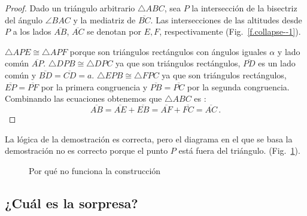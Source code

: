 \begin{proof}
Dado un triángulo arbitrario $\triangle ABC$, sea $P$ la intersección de la bisectriz del ángulo $\angle BAC$ y la mediatriz de $\overline{BC}$. Las intersecciones de las altitudes desde $P$ a los lados $\overline{AB}$, $\overline{AC}$ se denotan por $E,F$, respectivamente (Fig.~\ref{f.collapse--1}). 

$\triangle APE\cong \triangle APF$ porque son triángulos rectángulos con ángulos iguales $\alpha$ y lado común $\overline{AP}$. $\triangle DPB\cong \triangle DPC$ ya que son triángulos rectángulos, $\overline{PD}$ es un lado común y $\overline{BD}=\overline{CD}=a$. $\triangle EPB\cong \triangle FPC$ ya que son triángulos rectángulos, $\overline{EP}=\overline{PF}$ por la primera congruencia y $\overline{PB}=\overline{PC}$ por la segunda congruencia. Combinando las ecuaciones obtenemos que $\triangle ABC$ es :
\[
\overline{AB}= \overline{AE}+\overline{EB}=\overline{AF}+\overline{FC} =\overline{AC}\,.
\]
\end{proof}
\vspace{-2.5ex}
La lógica de la demostración es correcta, pero el diagrama en el que se basa la demostración no es correcto porque el punto $P$ está fuera del triángulo. (Fig.~\ref{f.collapse--2}).

\begin{figure}[b]
\begin{center}
\caption{Por qué no funciona la construcción}\label{f.collapse--2}
\end{center}
\end{figure}

\enlargethispage{2\baselineskip}

\subsection*{¿Cuál es la sorpresa?}

